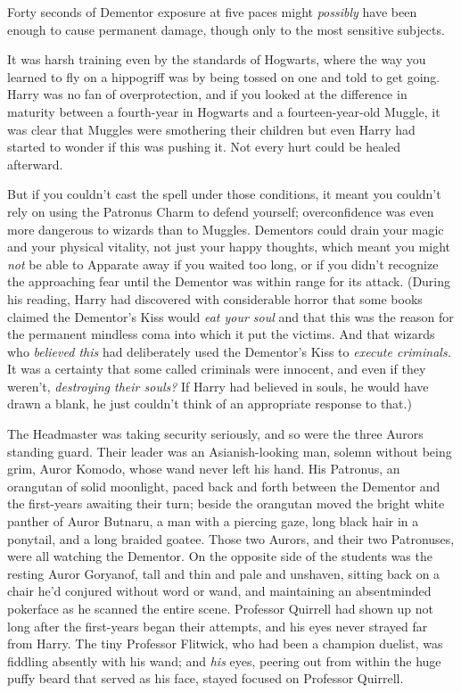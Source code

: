 Forty seconds of Dementor exposure at five paces might \emph{possibly} have
been enough to cause permanent damage, though only to the most sensitive
subjects.

It was harsh training even by the standards of Hogwarts, where the way you
learned to fly on a hippogriff was by being tossed on one and told to get
going. Harry was no fan of overprotection, and if you looked at the
difference in maturity between a fourth-year in Hogwarts and a
fourteen-year-old Muggle, it was clear that Muggles were smothering their
children{\el} but even Harry had started to wonder if this was pushing it.
Not every hurt could be healed afterward.

But if you couldn't cast the spell under those conditions, it meant you
couldn't rely on using the Patronus Charm to defend yourself; overconfidence
was even more dangerous to wizards than to Muggles. Dementors could drain your
magic and your physical vitality, not just your happy thoughts, which meant you
might \emph{not} be able to Apparate away if you waited too long, or if you
didn't recognize the approaching fear until the Dementor was within range for
its attack. (During his reading, Harry had discovered with considerable horror
that some books claimed the Dementor's Kiss would \emph{eat your soul} and that
this was the reason for the permanent mindless coma into which it put the
victims. And that wizards who \emph{believed this} had deliberately used the
Dementor's Kiss to \emph{execute criminals.} It was a certainty that some
called criminals were innocent, and even if they weren't, \emph{destroying
their souls?} If Harry had believed in souls, he would have{\el} drawn a
blank, he just couldn't think of an appropriate response to that.)

The Headmaster was taking security seriously, and so were the three Aurors
standing guard. Their leader was an Asianish-looking man, solemn without being
grim, Auror Komodo, whose wand never left his hand. His Patronus, an orangutan
of solid moonlight, paced back and forth between the Dementor and the
first-years awaiting their turn; beside the orangutan moved the bright white
panther of Auror Butnaru, a man with a piercing gaze, long black hair in a
ponytail, and a long braided goatee. Those two Aurors, and their two
Patronuses, were all watching the Dementor. On the opposite side of the
students was the resting Auror Goryanof, tall and thin and pale and unshaven,
sitting back on a chair he'd conjured without word or wand, and maintaining an
absentminded pokerface as he scanned the entire scene. Professor Quirrell had
shown up not long after the first-years began their attempts, and his eyes
never strayed far from Harry. The tiny Professor Flitwick, who had been a
champion duelist, was fiddling absently with his wand; and \emph{his} eyes,
peering out from within the huge puffy beard that served as his face, stayed
focused on Professor Quirrell.

